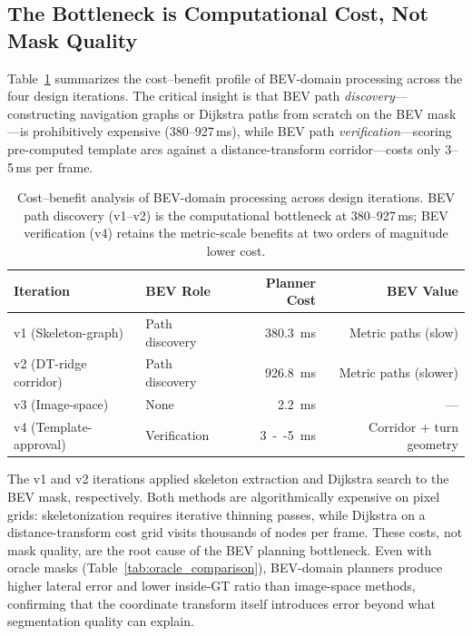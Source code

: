 \documentclass[12pt,letterpaper,oneside]{report}
\begin{document}
\subsection{The Bottleneck is Computational Cost, Not Mask Quality}

Table~\ref{tab:bev_fragility} summarizes the cost--benefit profile of BEV-domain processing across the four design iterations.  The critical insight is that BEV path \emph{discovery}---constructing navigation graphs or Dijkstra paths from scratch on the BEV mask---is prohibitively expensive (380--927\,ms), while BEV path \emph{verification}---scoring pre-computed template arcs against a distance-transform corridor---costs only 3--5\,ms per frame.

\begin{table}[h]
\centering
\caption{Cost--benefit analysis of BEV-domain processing across design iterations.  BEV path discovery (v1--v2) is the computational bottleneck at 380--927\,ms; BEV verification (v4) retains the metric-scale benefits at two orders of magnitude lower cost.}
\label{tab:bev_fragility}
\begin{tabular}{llrr}
\toprule
Iteration & BEV Role & Planner Cost & BEV Value \\
\midrule
v1 (Skeleton-graph)     & Path discovery   & \SI{380.3}{ms} & Metric paths (slow) \\
v2 (DT-ridge corridor)  & Path discovery   & \SI{926.8}{ms} & Metric paths (slower) \\
v3 (Image-space)        & None             & \SI{2.2}{ms}   & --- \\
v4 (Template-approval)  & Verification     & \SI{3}{--}\SI{5}{ms} & Corridor + turn geometry \\
\bottomrule
\end{tabular}
\end{table}

The v1 and v2 iterations applied skeleton extraction and Dijkstra search to the BEV mask, respectively.  Both methods are algorithmically expensive on pixel grids: skeletonization requires iterative thinning passes, while Dijkstra on a distance-transform cost grid visits thousands of nodes per frame.  These costs, not mask quality, are the root cause of the BEV planning bottleneck.  Even with oracle masks (Table~\ref{tab:oracle_comparison}), BEV-domain planners produce higher lateral error and lower inside-GT ratio than image-space methods, confirming that the coordinate transform itself introduces error beyond what segmentation quality can explain.
\end{document}
